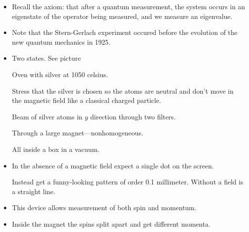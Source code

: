 \documentclass[11pt, a4paper]{article}
\begin{document}
\begin{itemize}
    \item Recall the axiom: that after a quantum measurement, the system occurs in an eigenstate of the operator being measured, and we measure an eigenvalue.

    \item Note that the Stern-Gerlach experiment occured before the evolution of the new quantum mechanics in 1925. 

    \item Two states. See picture

    Oven with silver at 1050 celsius. 

    Stress that the silver is chosen so the atoms are neutral and don't move in the magnetic field like a classical charged particle. 

    Beam of silver atoms in $ y $ direction through two filters.

    Through a large magnet---nonhomogeneous. 

    All inside a box in a vacuum. 

    \item In the absence of a magnetic field expect a single dot on the screen. 

    Instead get a funny-looking pattern of order 0.1 millimeter. Without a field is a straight line. 

    \item This device allows measurement of both spin and momentum. 

    \item Inside the magnet the spins split apart and get different momenta. 
\end{itemize}
\end{document}
